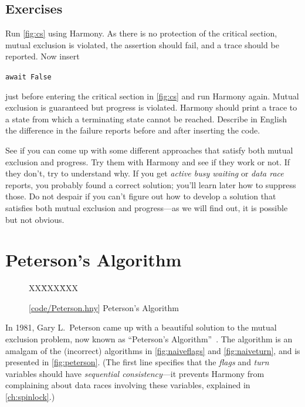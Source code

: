 \documentclass{report}
\newcommand{\harmonysource}[1]{
\begin{tabbing}
XX\=XXX\=XXX\kill
    
\end{tabbing}
}
\newcommand{\harmonylink}[1]{%
[\href{https://harmony.cs.cornell.edu/#1}{\underline{#1}}]%
}
\newenvironment{code}{
\tcolorbox
}{
\endtcolorbox
}
\begin{document}
\section*{Exercises}
\begin{problems}
\item Run \autoref{fig:cs} using Harmony.  As there is no protection of the critical
section, mutual exclusion is violated,
the assertion should fail, and a trace should be reported.
Now insert
\begin{code}
\texttt{await False}
\end{code}
just before entering the critical section
in \autoref{fig:cs} and run Harmony again.
Mutual exclusion is guaranteed but progress is violated.
Harmony should print a trace
to a state from which a terminating state cannot be reached.
Describe in English the difference in the failure reports before
and after inserting the code.
\item See if you can come up with some different approaches that satisfy both
mutual exclusion and progress.  Try them with Harmony and see if they work or not.
If they don't, try to understand why.
If you get \emph{active busy waiting} or \emph{data race} reports, you probably
found a correct solution; you'll learn later how to suppress those.
Do not despair if you can't figure out how to develop a solution that satisfies both
mutual exclusion and progress---as we will find out, it is possible but not obvious.
\end{problems}

\chapter{Peterson's Algorithm}
\label{ch:peterson}
%

\begin{figure}
\begin{code}
\harmonysource{Peterson}
\end{code}
\caption{\harmonylink{code/Peterson.hny} Peterson's Algorithm}
\label{fig:peterson}
\end{figure}

%
In 1981, Gary L.~Peterson came up with a beautiful solution to the mutual exclusion
problem, now known as ``Peterson's Algorithm''~\cite{Peterson81}.
The algorithm is an amalgam of the (incorrect) algorithms in
\autoref{fig:naiveflags} and \autoref{fig:naiveturn}, and is presented
in \autoref{fig:peterson}.
(The first line specifies that the \textit{flags} and \textit{turn}
variables should have \emph{sequential consistency}---it prevents
Harmony from complaining about data races involving these variables,
explained in \autoref{ch:spinlock}.)
\end{document}
